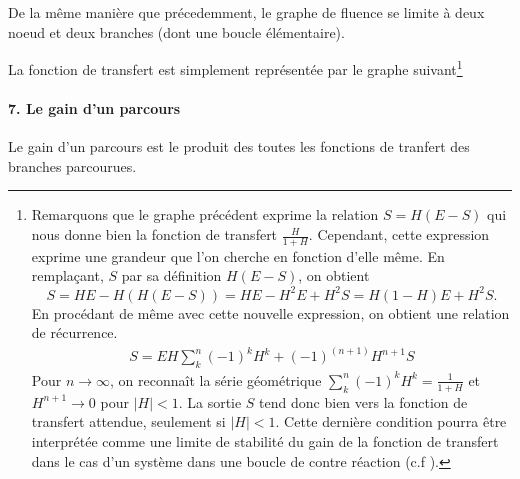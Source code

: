 De la même manière que précedemment, le graphe de fluence se limite à 
deux noeud et deux branches (dont une boucle élémentaire).
\begin{center}
    
\end{center}
La fonction de transfert est simplement représentée par le graphe 
suivant\footnote{Remarquons que le graphe précédent exprime la relation 
$S=H(E-S)$ qui nous donne bien la fonction de transfert $\frac{H}{1+H}$. 
Cependant, cette expression exprime une grandeur que l'on cherche en fonction 
d'elle même. En remplaçant, $S$ par sa définition $H(E-S)$, on obtient
\[
    S=HE-H(H(E-S))=HE-H^2E+H^2S=H(1-H)E+H^2S.
\]
En procédant de même avec cette nouvelle expression, on obtient une 
relation de récurrence. 
\begin{align*}
    S=EH\sum_k^n (-1)^kH^k+(-1)^{(n+1)}H^{n+1}S
\end{align*}
Pour $n\rightarrow\infty$, on reconnaît la série géométrique 
$\sum_k^n(-1)^kH^k=\frac{1}{1+H}$ et $H^{n+1}\rightarrow 0$ pour $|H|<1$.
La sortie $S$ tend donc bien vers la fonction de transfert attendue, 
seulement si $|H|<1$. Cette dernière condition pourra être interprétée 
comme une limite de stabilité du gain de la fonction de transfert dans 
le cas d'un système dans une boucle de contre réaction (c.f ).}
\begin{center}
    
\end{center}
\paragraph{7. Le gain d'un parcours}
Le gain d'un parcours est le produit des toutes 
les fonctions de tranfert des branches parcourues. 

